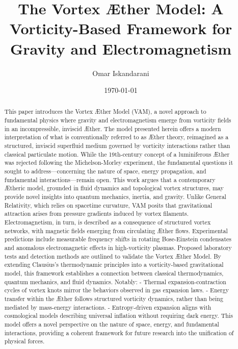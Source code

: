 \documentclass[a4paper,10pt]{article}
\title{The Vortex \AE ther Model: A Vorticity-Based Framework for Gravity and Electromagnetism}
\author{Omar Iskandarani}
\date{\today}
\begin{document}
    \maketitle

    \maketitle

    \begin{abstract}
        This paper introduces the Vortex \AE ther Model (VAM), a novel approach to fundamental physics where gravity and electromagnetism emerge from vorticity fields in an incompressible, inviscid \AE ther. The model presented herein offers a modern interpretation of what is conventionally referred to as Æther theory, reimagined as a structured, inviscid superfluid medium governed by vorticity interactions rather than classical particulate motion. While the 19th-century concept of a luminiferous Æther was rejected following the Michelson-Morley experiment, the fundamental questions it sought to address—concerning the nature of space, energy propagation, and fundamental interactions—remain open. This work argues that a contemporary Ætheric model, grounded in fluid dynamics and topological vortex structures, may provide novel insights into quantum mechanics, inertia, and gravity.        Unlike General Relativity, which relies on spacetime curvature, VAM posits that gravitational attraction arises from pressure gradients induced by vortex filaments. Electromagnetism, in turn, is described as a consequence of structured vortex networks, with magnetic fields emerging from circulating Æther flows. Experimental predictions include measurable frequency shifts in rotating Bose-Einstein condensates and anomalous electromagnetic effects in high-vorticity plasmas. Proposed laboratory tests and detection methods are outlined to validate the Vortex Æther Model.        By extending Clausius’s thermodynamic principles into a vorticity-based gravitational model, this framework establishes a connection between classical thermodynamics, quantum mechanics, and fluid dynamics. Notably:        - Thermal expansion-contraction cycles of vortex knots mirror the behaviors observed in gas expansion laws.        - Energy transfer within the Æther follows structured vorticity dynamics, rather than being mediated by mass-energy interactions.        - Entropy-driven expansion aligns with cosmological models describing universal inflation without requiring dark energy.        This model offers a novel perspective on the nature of space, energy, and fundamental interactions, providing a coherent framework for future research into the unification of physical forces.
    \end{abstract}
\end{document}
